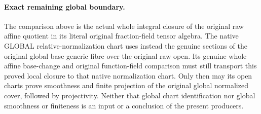 \paragraph{Exact remaining global boundary.}
The comparison above is the actual whole integral closure of the original
raw affine quotient in its literal original fraction-field tensor algebra.
The native GLOBAL relative-normalization chart uses instead the genuine
sections of the original global base-generic fibre over the original raw open.
Its genuine whole affine base-change and original function-field comparison
must still transport this proved local closure to that native normalization
chart. Only then may its open charts prove smoothness and finite projection
of the original global normalized cover, followed by projectivity. Neither
that global chart identification nor global smoothness or finiteness is an
input or a conclusion of the present producers.
